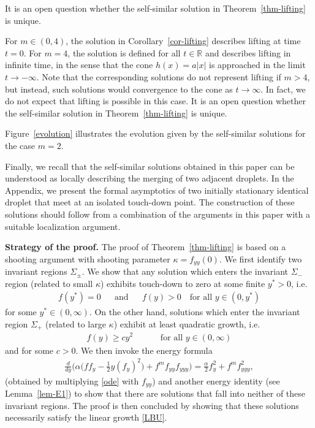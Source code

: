 \documentclass{article}%
\newcommand{\alp}{\alpha}
\newcommand{\kap}{\kappa}
\newcommand{\R}{\mathbb{R}}
\begin{document}
It is an open question whether the self-similar solution in Theorem~\ref{thm-lifting} is
unique. 

For $m \in (0,4)$, the solution in Corollary~\ref{cor-lifting} describes lifting
at time $t = 0$.  For $m=4$, the solution is defined for all $t \in \R$ and
  describes lifting in infinite time, in the sense that the cone $h(x)=a|x|$
is approached in the limit $t \to -\infty$. Note that the
corresponding solutions do not represent lifting if $m>4$, but instead, such
solutions would convergence to the cone as $t\to\infty$. In
fact, we do not expect that lifting is possible in this case. 
It is an open question whether the self-similar solution in Theorem~\ref{thm-lifting} is
unique.

Figure~\ref{evolution} illustrates the evolution given by the
self-similar solutions for the case $m=2$. 

Finally, we recall that the self-similar solutions obtained in this
paper can be understood as locally describing the merging of two adjacent 
droplets. In the Appendix, we present the formal asymptotics of two
initially stationary identical droplet that meet at an isolated
touch-down point. The construction of these solutions should follow from a
combination of the arguments in this paper with a suitable localization
argument.

\medskip

\textbf{Strategy of the proof.} The proof of Theorem~\ref{thm-lifting} is based on a shooting argument
 with shooting parameter $\kappa=f_{yy}(0)$. We first identify two invariant regions $\Sigma_\pm$. 
We show that any solution which enters the invariant $\Sigma_-$ region (related to small $\kap$) exhibits 
touch-down to zero at some finite $y^{\ast}>0$, i.e.
\begin{align}\label{TDB}
  f(y^{\ast}) = 0 && \text{and} && 
  f(y) >0 \quad\mbox{for all } y \in (0,y^{\ast})
\end{align}
for some $y^{\ast} \in(0,\infty)$. On the other hand, solutions which enter the
invariant region $\Sigma_+$ (related to large $\kappa$) exhibit at least
quadratic growth, i.e.
\begin{align}\label{FQBU} %
  f(y) \geq c y^2 && 
  && \text{for all $y \in (0,\infty)$}
\end{align}
and for some $c > 0$. We then invoke the energy formula
\begin{align}\label{bas-en}
  \frac{d}{dy}\Big( \alp\Big(f f_{y}-\frac{1}{2}y (f_{y})^2\Big) + f^{m}f_{yy}f_{yyy} \Big)
  =\frac{\alp}{2} f_{y}^2  + f^{m} f_{yyy}^{2},
\end{align}
(obtained by multiplying \eqref{ode} with $f_{yy}$) and another energy
  identity (see Lemma~\ref{lem-E1}) to show that there are solutions that fall 
into neither of these invariant regions. The proof is then concluded by
showing that these solutions necessarily satisfy the linear growth \eqref{LBU}.
\end{document}
